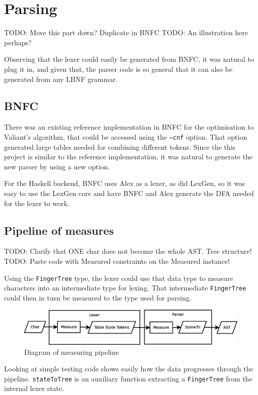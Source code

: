 \documentclass[a4paper,12pt,twosided]{report}
\begin{document}
\section{Parsing}
TODO: Move this part down? Duplicate in BNFC
TODO: An illustration here perhaps?

Observing that the lexer could easily be generated from BNFC, it was natural to
plug it in, and given that, the parser code is so general that it can also be
generated from any LBNF grammar.
\subsection{BNFC}
There was an existing reference implementation in BNFC for the optimisation to
Valiant's algorithm, that could be accessed using the \texttt{--cnf} option.
That option generated large tables needed for combining different tokens. Since
the this project is similar to the reference implementation, it was natural to
generate the new parser by using a new option.

For the Haskell backend, BNFC uses Alex as a lexer, as did LexGen, so it was
easy to use the LexGen core and have BNFC and Alex generate the DFA needed for
the lexer to work. 

\subsection{Pipeline of measures}
\label{pipeline}
TODO: Clarify that ONE char does not become the whole AST. Tree structure!
TODO: Paste code with Measured constraints on the Measured instance!

Using the \texttt{FingerTree} type, the lexer could use that data type to
measure characters into an intermediate type for lexing. That intermediate
\texttt{FingerTree} could then in turn be measured to the type used for parsing.

\begin{figure}[H]
\includegraphics[width=\textwidth]{pipeline.eps}
\caption{\label{pipelinedia}Diagram of measuring pipeline}
\end{figure}

Looking at simple testing code shows easily how the data progresses through the
pipeline. \texttt{stateToTree} is an auxiliary function extracting a
\texttt{FingerTree} from the internal lexer state.
\end{document}
